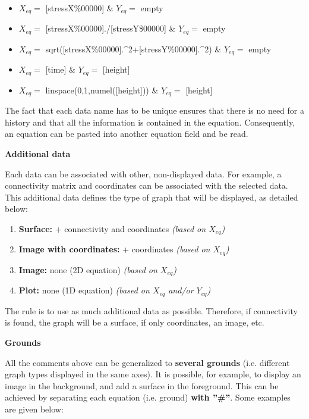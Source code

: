 \documentclass{article}
\begin{document}
\begin{itemize}
    \item $X_{eq}=$ [stressX\%00000] \& $Y_{eq}=$ empty
    \item $X_{eq}=$ [stressX\%00000]./[stressY\$00000] \& $Y_{eq}=$ empty
    \item $X_{eq}=$ sqrt([stressX\%00000].\^{}2+[stressY\%00000].\^{}2) \& $Y_{eq}=$ empty
    \item $X_{eq}=$ [time] \& $Y_{eq}=$ [height]
    \item $X_{eq}=$ linspace(0,1,numel([height])) \& $Y_{eq}=$ [height]
\end{itemize}

The fact that each data name has to be unique ensures that there is no need for a history and that all the information is contained in the equation. Consequently, an equation can be pasted into another equation field and be read.
\newline

\textbf{Additional data}\newline

\par
Each data can be associated with other, non-displayed data. For example, a connectivity matrix and coordinates can be associated with the selected data. This additional data defines the type of graph that will be displayed, as detailed below:

\begin{enumerate}
    \item \textbf{Surface:} + connectivity and coordinates \textit{(based on $X_{eq}$)}
    \item \textbf{Image with coordinates:} + coordinates \textit{(based on $X_{eq}$)}
    \item \textbf{Image:} none (2D equation) \textit{(based on $X_{eq}$)}
    \item \textbf{Plot:} none (1D equation) \textit{(based on $X_{eq}$ and/or $Y_{eq}$)}
\end{enumerate}

The rule is to use as much additional data as possible. Therefore, if connectivity is found, the graph will be a surface, if only coordinates, an image, etc.
\newline

\textbf{Grounds}\newline

\par
All the comments above can be generalized to \textbf{several grounds} (i.e. different graph types displayed in the same axes). It is possible, for example, to display an image in the background, and add a surface in the foreground. This can be achieved by separating each equation (i.e. ground) \textbf{with ''\#''}. Some examples are given below:
\end{document}

